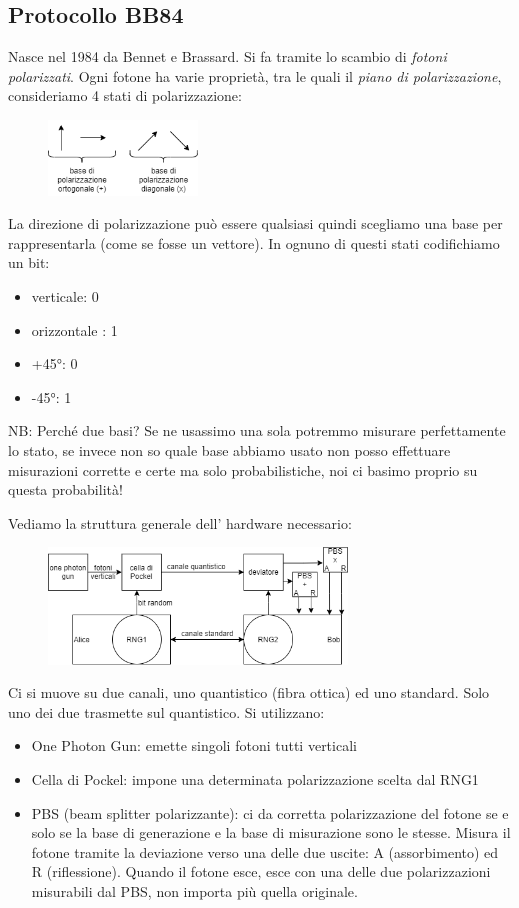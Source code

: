 \subsection{Protocollo BB84}
Nasce nel 1984 da Bennet e Brassard.
Si fa tramite lo scambio di \emph{fotoni polarizzati}.
Ogni fotone ha varie proprietà, tra le quali il \emph{piano di polarizzazione}, consideriamo 4 stati di polarizzazione:

\begin{figure}[H]
    \centering
    \includegraphics[width=150px]{QDK_1.png}
\end{figure}

La direzione di polarizzazione può essere qualsiasi quindi scegliamo una base per rappresentarla (come se fosse un vettore).
In ognuno di questi stati codifichiamo un bit:
\begin{itemize}
    \item verticale: 0
    \item orizzontale : 1
    \item +45°: 0
    \item -45°: 1
\end{itemize}

NB: Perché due basi? Se ne usassimo una sola potremmo misurare perfettamente lo stato, se invece non so quale base abbiamo usato non posso effettuare misurazioni corrette e certe ma solo probabilistiche, noi ci basimo proprio su questa probabilità!

Vediamo la struttura generale dell' hardware necessario:

\begin{figure}[H]
    \centering
    \includegraphics[width=300px]{QDK_2.png}
\end{figure}

Ci si muove su due canali, uno quantistico (fibra ottica) ed uno standard. Solo uno dei due trasmette sul quantistico. Si utilizzano:
\begin{itemize}
    \item One Photon Gun: emette singoli fotoni tutti verticali
    \item Cella di Pockel: impone una determinata polarizzazione scelta dal RNG1
    \item PBS (beam splitter polarizzante): ci da corretta polarizzazione del fotone se e solo se la base di generazione e la base di misurazione sono le stesse. Misura il fotone tramite la deviazione verso una delle due uscite: A (assorbimento) ed R (riflessione).
    Quando il fotone esce, esce con una delle due polarizzazioni misurabili dal PBS, non importa più quella originale.
\end{itemize}

